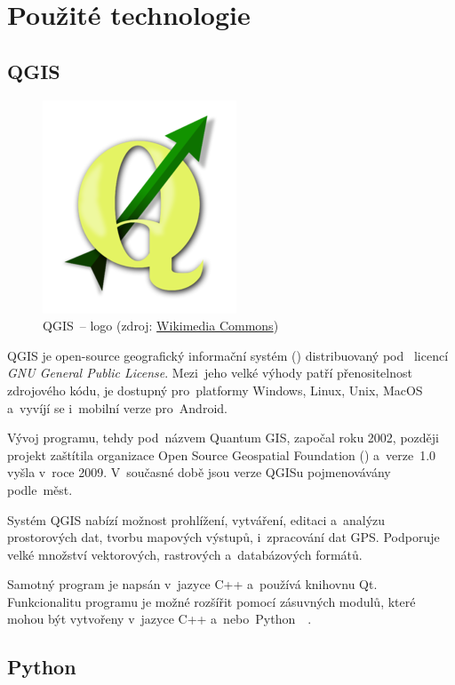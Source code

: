 \chapter{Použité technologie}
\label{technologie}

\section{QGIS}
\label{qgis}

	\begin{figure}[H]
		\centering
		\includegraphics[width=.3\textwidth]{./pictures/qgis_logo.png}
      	\caption[QGIS~– logo]{QGIS~– logo (zdroj: \href{https://commons.wikimedia.org/wiki/File:QGis_Logo.png}{Wikimedia Commons})}
		\label{fig:qgis_logo}
 	\end{figure}

QGIS je open-source geografický informační systém () distribuovaný pod ~licencí \textit{GNU General Public License}. Mezi~jeho velké výhody patří přenositelnost zdrojového kódu, je dostupný pro~platformy Windows, Linux, Unix, MacOS a~vyvíjí se i~mobilní verze pro~Android.

Vývoj programu, tehdy pod~názvem Quantum GIS, započal roku 2002, později projekt zaštítila organizace Open Source Geospatial Foundation () a~verze~1.0 vyšla v~roce 2009. V~současné době jsou verze QGISu pojmenovávány podle~měst.

Systém QGIS nabízí možnost prohlížení, vytváření, editaci a~analýzu prostorových dat, tvorbu mapových výstupů, i~zpracování dat GPS. Podporuje velké množství vektorových, rastrových a~databázových formátů.

Samotný program je napsán v~jazyce C++ a~používá knihovnu Qt. Funkcionalitu programu je možné rozšířit pomocí zásuvných modulů, které mohou být vytvořeny v~jazyce C++ a~nebo~Python~\citep{qgis}~\citep{wiki_qgis}.

\section{Python}
\label{python}

